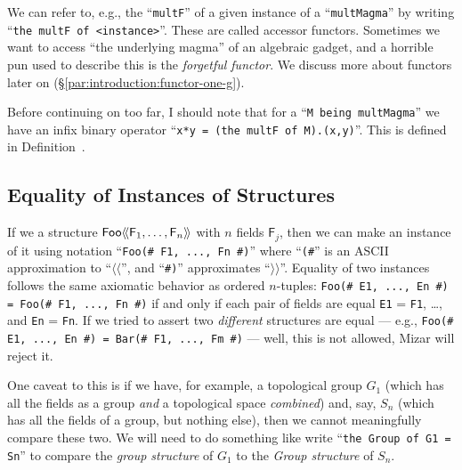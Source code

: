 \begin{notation}
We can refer to, e.g., the ``\verb#multF#'' of a given instance of a
``\verb#multMagma#'' by writing
``\verb#the multF of <instance>#''. These are called accessor
functors. Sometimes we want to access ``the underlying magma'' of an
algebraic gadget, and a horrible pun used to describe this is the
\emph{forgetful functor}. We discuss more about
functors later on (\S\ref{par:introduction:functor-one-g}).
\end{notation}

\begin{aside}\label{rmk:introduction:multiplication-operator}
Before continuing on too far, I should note that for a
``\texttt{M being multMagma}'' we have an infix binary operator
``\texttt{x*y = (the multF of M).(x,y)}''. This is defined in
Definition~.
\end{aside}

\subsection{Equality of Instances of Structures}
If we a structure $\struct[Foo]{\mathsf{F}_{1},\dots,\mathsf{F}_{n}}$
with $n$ fields $\mathsf{F}_{j}$, then we can make an instance of it
using notation ``\verb$Foo(# F1, ..., Fn #)$'' where ``\verb$(#$'' is an
ASCII approximation to ``$\langle\!\langle$'', and ``\verb$#)$'' approximates
``$\rangle\!\rangle$''. Equality of two
instances follows the same axiomatic behavior as ordered $n$-tuples:
\verb$Foo(# E1, ..., En #) = Foo(# F1, ..., Fn #)$ if and only if each
pair of fields are equal
\verb#E1# = \verb#F1#, \dots, and \verb#En# = \verb#Fn#. If we tried
to assert two \emph{different} structures are equal --- e.g.,
\verb$Foo(# E1, ..., En #) = Bar(# F1, ..., Fm #)$ --- well, this is not
allowed, Mizar will reject it.

One caveat to this is if we have, for example, a topological group
$G_{1}$ (which has all the fields as a group \emph{and} a topological
space \emph{combined}) and, say, $S_{n}$ (which has all the fields of a
group, but nothing else), then we cannot meaningfully compare these
two. We will need to do something like write ``\verb#the Group of G1 = Sn#''
to compare the \emph{group structure} of $G_{1}$ to the \emph{Group structure}
of $S_{n}$.

